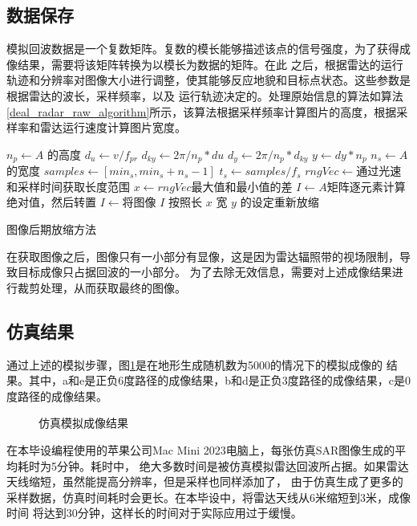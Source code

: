 \documentclass{xduugthesis}
\begin{document}
\subsection{数据保存}
模拟回波数据是一个复数矩阵。复数的模长能够描述该点的信号强度，为了获得成像结果，需要将该矩阵转换为以模长为数据的矩阵。在此
之后，根据雷达的运行轨迹和分辨率对图像大小进行调整，使其能够反应地貌和目标点状态。这些参数是根据雷达的波长，采样频率，以及
运行轨迹决定的。处理原始信息的算法如算法\ref{deal_radar_raw_algorithm}所示，该算法根据采样频率计算图片的高度，根据采
样率和雷达运行速度计算图片宽度。\par
\IncMargin{2em}
\begin{algorithm}[H]
	$n_{p} \leftarrow A$ 的高度 \;
	$d_u \leftarrow v/f_{pr}$ \;
	$d_{ky} \leftarrow 2\pi /n_{p}*du$ \;
	$d_y \leftarrow 2\pi / n_{p}*d_{ky}$ \;
	$y \leftarrow dy * n_{p}$ \;
	$n_{s} \leftarrow A$ 的宽度 \;
	$samples \leftarrow [min_s, min_s + n_s - 1] $\;
	$t_{s} \leftarrow samples / f_s $\;
	$rngVec \leftarrow $通过光速和采样时间获取长度范围\;
	$x \leftarrow rngVec$最大值和最小值的差\;
	$I \leftarrow A$矩阵逐元素计算绝对值，然后转置\;
	$I \leftarrow $将图像 $I$ 按照长 $x$ 宽 $y$ 的设定重新放缩\;
	\caption{图像后期放缩方法}\label{deal_radar_raw_algorithm}
\end{algorithm}
\DecMargin{2em}
在获取图像之后，图像只有一小部分有显像，这是因为雷达辐照带的视场限制，导致目标成像只占据回波的一小部分。
为了去除无效信息，需要对上述成像结果进行裁剪处理，从而获取最终的图像。
\subsection{仿真结果}\label{simulation_result_subsection}
通过上述的模拟步骤，图\ref{simulation_result_image}是在地形生成随机数为5000的情况下的模拟成像的
结果。其中，a和e是正负6度路径的成像结果，b和d是正负3度路径的成像结果，c是0度路径的成像结果。\par
\begin{figure}[!htb]
	\centering
	\caption{仿真模拟成像结果}\label{simulation_result_image}
\end{figure}
在本毕设编程使用的苹果公司Mac Mini 2023电脑上，每张仿真SAR图像生成的平均耗时为5分钟。耗时中，
绝大多数时间是被仿真模拟雷达回波所占据。如果雷达天线缩短，虽然能提高分辨率，但是采样也同样添加了，
由于仿真生成了更多的采样数据，仿真时间耗时会更长。在本毕设中，将雷达天线从6米缩短到3米，成像时间
将达到30分钟，这样长的时间对于实际应用过于缓慢。
\end{document}
